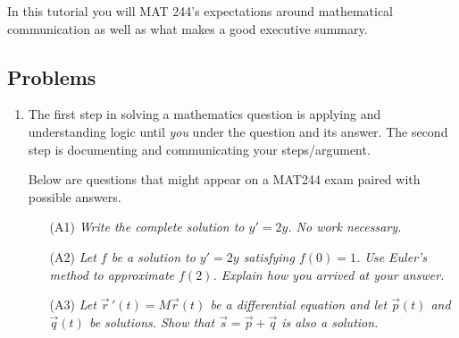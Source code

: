 \begin{objectives}
	In this tutorial you will MAT 244's expectations around mathematical communication as well
	as what makes a good executive summary.
\end{objectives}

\vspace{-.5em}
\subsection*{Problems}
\vspace{-.5em}


\begin{enumerate}
	\item The first step in solving a mathematics question is applying and understanding logic until \emph{you}
	under the question and its answer. The second step is documenting and communicating your steps/argument. 
	

	Below are questions that might appear on a MAT244 exam paired with possible answers.

	\begin{enumerate}
		\item[(A1)] \emph{Write the complete solution to $y'=2y$. No work necessary.}


		\item[(A2)] \emph{Let $f$ be a solution to $y'=2y$ satisfying $f(0)=1$. Use Euler's method to approximate $f(2)$. Explain how you arrived at your answer.}
		

		\item[(A3)] \emph{Let $\vec r\,'(t)=M\vec r(t)$ be a differential equation and let $\vec p(t)$ and $\vec q(t)$
		be solutions. Show that $\vec s = \vec p+\vec q$ is also a solution.}


\end{enumerate}
\end{enumerate}
